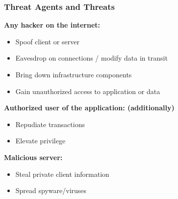 \subsubsection{Threat Agents and Threats}
\textbf{Any hacker on the internet:}
\begin{itemize}
    \item Spoof client or server
    \item Eavesdrop on connections / modify data in transit
    \item Bring down infrastructure components
    \item Gain unauthorized access to application or data
\end{itemize}
\textbf{Authorized user of the application: (additionally)}
\begin{itemize}
    \item Repudiate transactions
    \item Elevate privilege
\end{itemize}
\textbf{Malicious server:}
\begin{itemize}
    \item Steal private client information
    \item Spread spyware/viruses
\end{itemize}


